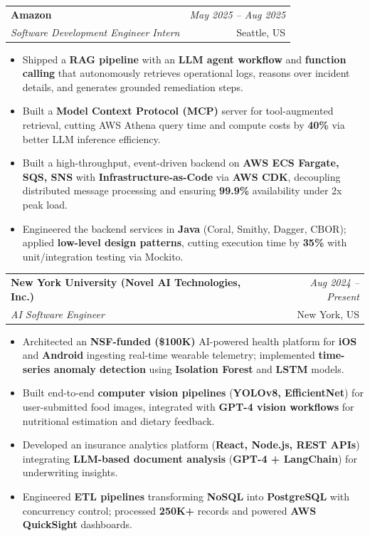 \documentclass[a4paper,10pt]{article}
\makeatletter
\newcommand{\resumeSubheading}[4]{
\vspace{0.3mm}\item
    \begin{tabular*}{0.98\textwidth}[t]{l@{\extracolsep{\fill}}r}
        \textbf{#1} & \textit{\footnotesize{#4}} \\
        \textit{\footnotesize{#3}} & \footnotesize{#2}\\
    \end{tabular*}\vspace{-2mm}
}
\newcommand{\resumeItemListStart}{\begin{itemize}[leftmargin=*, labelsep=1mm, itemsep=0pt]}
\newcommand{\resumeItemListEnd}{\end{itemize}\vspace{-2mm}}
\makeatother
\begin{document}
\resumeSubheading
{Amazon}{Seattle, US}
{Software Development Engineer Intern}{May 2025 -- Aug 2025}
\resumeItemListStart
\item \footnotesize{Shipped a \textbf{RAG pipeline} with an \textbf{LLM agent workflow} and \textbf{function calling} that autonomously retrieves operational logs, reasons over incident details, and generates grounded remediation steps.}
\item \footnotesize{Built a \textbf{Model Context Protocol (MCP)} server for tool-augmented retrieval, cutting AWS Athena query time and compute costs by \textbf{40\%} via better LLM inference efficiency.}
\item \footnotesize{Built a high-throughput, event-driven backend on \textbf{AWS ECS Fargate, SQS, SNS} with \textbf{Infrastructure-as-Code} via \textbf{AWS CDK}, decoupling distributed message processing and ensuring \textbf{99.9\%} availability under 2x peak load.}
\item \footnotesize{Engineered the backend services in \textbf{Java} (Coral, Smithy, Dagger, CBOR); applied \textbf{low-level design patterns}, cutting execution time by \textbf{35\%} with unit/integration testing via Mockito.}
\resumeItemListEnd

\resumeSubheading
{New York University (Novel AI Technologies, Inc.)}{New York, US}
{AI Software Engineer}{Aug 2024 -- Present}
\resumeItemListStart
\item \footnotesize{Architected an \textbf{NSF-funded (\$100K)} AI-powered health platform for \textbf{iOS} and \textbf{Android} ingesting real-time wearable telemetry; implemented \textbf{time-series anomaly detection} using \textbf{Isolation Forest} and \textbf{LSTM} models.}
\item \footnotesize{Built end-to-end \textbf{computer vision pipelines} (\textbf{YOLOv8, EfficientNet}) for user-submitted food images, integrated with \textbf{GPT-4 vision workflows} for nutritional estimation and dietary feedback.}
\item \footnotesize{Developed an insurance analytics platform (\textbf{React, Node.js, REST APIs}) integrating \textbf{LLM-based document analysis} (\textbf{GPT-4 + LangChain}) for underwriting insights.}
\item \footnotesize{Engineered \textbf{ETL pipelines} transforming \textbf{NoSQL} into \textbf{PostgreSQL} with concurrency control; processed \textbf{250K+} records and powered \textbf{AWS QuickSight} dashboards.}
\resumeItemListEnd
\end{document}
